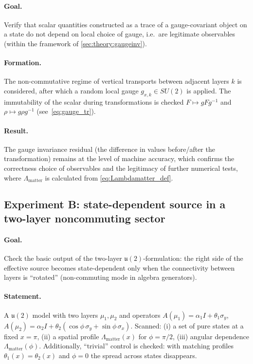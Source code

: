 \documentclass[11pt,a4paper]{article}
\theoremstyle{definition}
\theoremstyle{plain}
\theoremstyle{remark}
\begin{document}
\paragraph{Goal.}
Verify that scalar quantities constructed as a trace of a gauge-covariant object on a state
do not depend on local choice of gauge, i.e.\ are legitimate observables (within the framework of \cref{sec:theory:gaugeinv}).

\paragraph{Formation.}
The non-commutative regime of vertical transports between adjacent layers $k$ is considered,
after which a random local gauge $g_{x,k}\in SU(2)$ is applied.
The immutability of the scalar during transformations is checked
$F\mapsto gFg^{-1}$ and $\rho\mapsto g\rho g^{-1}$ (see\ \cref{eq:gauge_tr}).

\paragraph{Result.}
The gauge invariance residual (the difference in values before/after the transformation) remains at the level of machine accuracy,
which confirms the correctness choice of observables and the legitimacy of further numerical tests,
where $\Lambda_{\mathrm{matter}}$ is calculated from \cref{eq:Lambdamatter_def}.

\subsection{Experiment B: state-dependent source in a two-layer noncommuting sector}
\label{sec:numerics:B}

\paragraph{Goal.}
Check the basic output of the two-layer $\mathfrak u(2)$-formulation:
the right side of the effective source becomes state-dependent
only when the connectivity between layers is “rotated” (non-commuting mode in algebra generators).

\paragraph{Statement.}
A $\mathfrak u(2)$ model with two layers $\mu_1,\mu_2$ and operators
$A(\mu_1)=\alpha_1 I+\theta_1\sigma_y$, $A(\mu_2)=\alpha_2 I+\theta_2(\cos\phi\,\sigma_y+\sin\phi\,\sigma_x)$.
Scanned:
(i) a set of pure states at a fixed $x=\pi$,
(ii) a spatial profile $\Lambda_{\mathrm{matter}}(x)$ for $\phi=\pi/2$,
(iii) angular dependence $\Lambda_{\mathrm{matter}}(\phi)$.
Additionally, “trivial” control is checked: with matching profiles $\theta_1(x)=\theta_2(x)$ and $\phi=0$
the spread across states disappears.
\end{document}
